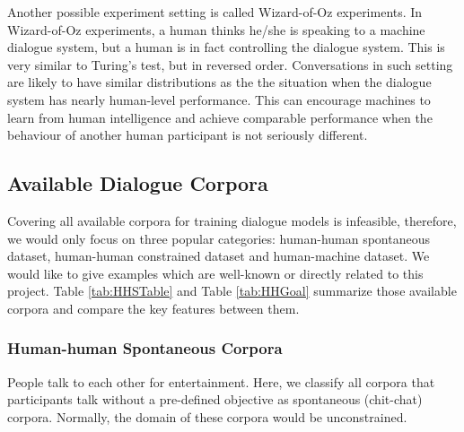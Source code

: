 \documentclass[bsc,frontabs,twoside,singlespacing,parskip,deptreport]{infthesis}     %
\begin{document}
Another possible experiment setting is called Wizard-of-Oz experiments\cite{bohus2008sorry,petrik2004wizard,budzianowski2018multiwoz,eric2019multiwoz}. In Wizard-of-Oz experiments, a human thinks he/she is speaking to a machine dialogue system, but a human is in fact controlling the dialogue system. This is very similar to Turing's test, but in reversed order. Conversations in such setting are likely to have similar distributions as the the situation when the dialogue system has nearly human-level performance. This can encourage machines to learn from human intelligence and achieve comparable performance when the behaviour of another human participant is not seriously different.  

\subsection{Available Dialogue Corpora}

Covering all available corpora for training dialogue models is infeasible, therefore, we would only focus on three popular categories: human-human spontaneous dataset, human-human constrained dataset and human-machine dataset. We would like to give examples which are well-known or directly related to this project. Table \ref{tab:HHSTable} and Table \ref{tab:HHGoal} summarize those available corpora and compare the key features between them.

\subsubsection*{Human-human Spontaneous Corpora}

People talk to each other for entertainment. Here, we classify all corpora that participants talk without a pre-defined objective as spontaneous (chit-chat) corpora. Normally, the domain of these corpora would be unconstrained.
\end{document}
